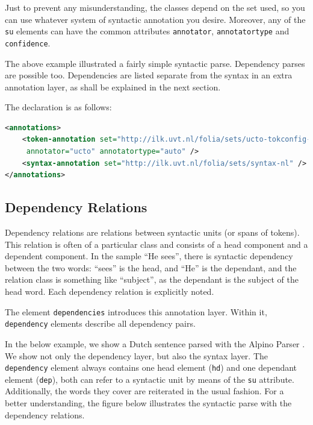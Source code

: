 \documentclass[a4paper,12pt]{report}
\begin{document}
Just to prevent any misunderstanding, the classes depend on the set used, so you can use whatever system of syntactic annotation you desire. Moreover, any of the \texttt{su} elements can have the common attributes \texttt{annotator}, \texttt{annotatortype} and \texttt{confidence}.


The above example illustrated a fairly simple syntactic parse. Dependency parses are possible too. Dependencies are listed separate from the syntax in an extra annotation layer, as shall be explained in the next section.

The declaration is as follows:

\begin{lstlisting}[language=xml]
<annotations>
    <token-annotation set="http://ilk.uvt.nl/folia/sets/ucto-tokconfig-nl" 
     annotator="ucto" annotatortype="auto" />
    <syntax-annotation set="http://ilk.uvt.nl/folia/sets/syntax-nl" />
</annotations>
\end{lstlisting}

\subsection{Dependency Relations}

Dependency relations are relations between syntactic units (or spans of tokens). This relation is often of a particular class and consists of a head component and a dependent component. In the sample ``He sees'', there is  syntactic dependency between the two words: ``sees'' is the head, and ``He'' is the dependant, and the relation class is something like ``subject'', as the dependant is the subject of the head word. Each dependency relation is explicitly noted.

The element \texttt{dependencies} introduces this annotation layer. Within it, \texttt{dependency} elements describe all dependency pairs. 

In the below example, we show a Dutch sentence parsed with the Alpino Parser \cite{ALPINO}. We show not only the dependency layer, but also the syntax layer. The \texttt{dependency} element always contains one head element (\texttt{hd}) and one dependant element (\texttt{dep}), both can refer to a syntactic unit by means of the \texttt{su} attribute. Additionally, the words they cover are reiterated in the usual fashion. For a better understanding, the figure below illustrates the syntactic parse with the dependency relations.
\end{document}
